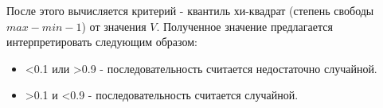 После этого вычисляется критерий - квантиль хи-квадрат (степень свободы $max - min - 1$) от значения $V$. Полученное значение предлагается интерпретировать следующим образом:
\begin{itemize}
	\item <0.1 или >0.9 - последовательность считается недостаточно случайной.
	\item >0.1 и <0.9 - последовательность считается случайной.
\end{itemize}
